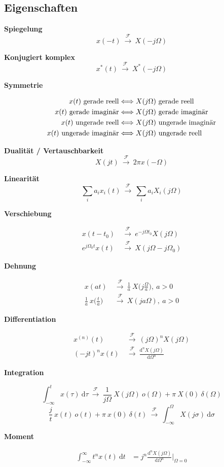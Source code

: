 \documentclass[10pt,a4paper]{article}
\newcommand{\fancyformula}[2]{
	\small
	\raggedright\sffamily\textbf{#1}
	#2
}
\newcommand{\ftransform}{
	~\xrightarrow{~\mathcal{F}~}~
}
\begin{document}
\subsection*{Eigenschaften}
\begin{multicols}{2}
	
\fancyformula{Spiegelung}{\[ x(-t)\ftransform X(-j\Omega) \]}
\fancyformula{Konjugiert komplex}{\[ x^*(t) \ftransform X^*(-j\Omega)\]}
\fancyformula{Symmetrie}{
\begin{align*}
	x(t) \textnormal{ gerade reell} &\Longleftrightarrow X(j\Omega) \textnormal{ gerade reell} \\
	x(t) \textnormal{ gerade imaginär} &\Longleftrightarrow X(j\Omega) \textnormal{ gerade imaginär} \\
	x(t) \textnormal{ ungerade reell} &\Longleftrightarrow X(j\Omega) \textnormal{ ungerade imaginär} \\
	x(t) \textnormal{ ungerade imaginär} &\Longleftrightarrow X(j\Omega) \textnormal{ ungerade reell} \\
\end{align*}
}
\fancyformula{Dualität / Vertauschbarkeit}{\[ X(jt)\ftransform 2\pi x(-\Omega) \]}
\fancyformula{Linearität}{\[ \sum_{i} a_i x_i(t) \ftransform \sum_{i} a_i X_i(j\Omega)\]}
\fancyformula{Verschiebung}{
\begin{align*}
	x(t-t_0) &\ftransform e^{-j\Omega t_0}X(j\Omega) \\
	e^{j\Omega_0t}x(t) &\ftransform X(j\Omega-j\Omega_0)
\end{align*}
}
\fancyformula{Dehnung}{
\begin{align*}
	x(at) &\ftransform \frac{1}{a}~X\bigg(j\frac{\Omega}{a}\bigg), ~ a > 0 \\
	\frac{1}{a}~x\bigg(\frac{t}{a}\bigg) &\ftransform X(ja\Omega), ~ a > 0
\end{align*}
}
\fancyformula{Differentiation}{
\begin{align*}
	x^{(n)}(t) &\ftransform (j\Omega)^nX(j\Omega) \\
	(-jt)^nx(t) &\ftransform \frac{\mathrm d^n X(j\Omega)}{\mathrm d\Omega^n}
\end{align*}	
}
\fancyformula{Integration}{
	\[\int_{-\infty}^{t}x(\tau) ~ \mathrm d\tau \ftransform \frac{1}{j\Omega}  ~ X(j\Omega) ~ o(\Omega) + \pi ~ X(0) ~ \delta(\Omega)\]
	\[\frac{j}{t} ~ x(t) ~ o(t) + \pi ~ x(0) ~ \delta(t) \ftransform \int_{-\infty}^{\Omega} X(j\sigma) ~ \mathrm d\sigma \]
}
\fancyformula{Moment}{
\begin{align*}
	\int_{-\infty}^{\infty}t^n x(t) ~ \mathrm dt &= j^n \frac{\mathrm d^nX(j\Omega)}{\mathrm d\Omega^n} \bigg|_{\Omega=0} \\

\end{align*}}
\end{multicols}
\end{document}
